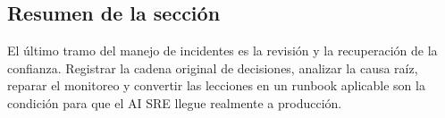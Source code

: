 \subsection{Resumen de la sección}

El último tramo del manejo de incidentes es la revisión y la recuperación de la confianza. Registrar la cadena original de decisiones, analizar la causa raíz, reparar el monitoreo y convertir las lecciones en un runbook aplicable son la condición para que el AI SRE llegue realmente a producción.
